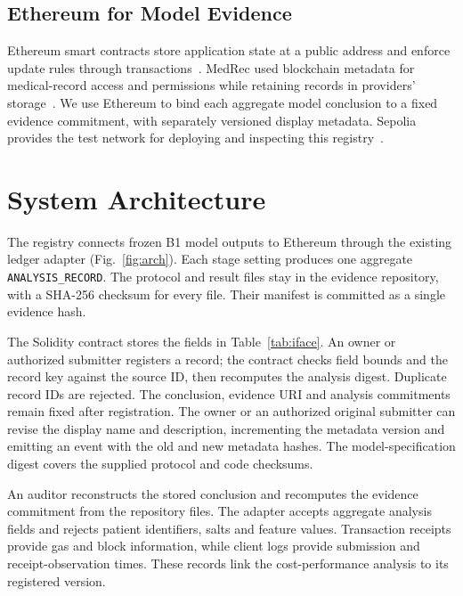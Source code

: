 \documentclass[journal,twoside]{IEEEtran}
\begin{document}
\subsection{Ethereum for Model Evidence}
Ethereum smart contracts store application state at a public address and enforce update rules through transactions~\cite{ethereumcontracts}. MedRec used blockchain metadata for medical-record access and permissions while retaining records in providers' storage~\cite{azaria2016}. We use Ethereum to bind each aggregate model conclusion to a fixed evidence commitment, with separately versioned display metadata. Sepolia provides the test network for deploying and inspecting this registry~\cite{ethereumnetworks}.

\section{System Architecture}
\label{sec:arch}
The registry connects frozen B1 model outputs to Ethereum through the existing ledger adapter (Fig.~\ref{fig:arch}). Each stage setting produces one aggregate \texttt{ANALYSIS\_RECORD}. The protocol and result files stay in the evidence repository, with a SHA-256 checksum for every file. Their manifest is committed as a single evidence hash.

The Solidity contract stores the fields in Table~\ref{tab:iface}. An owner or authorized submitter registers a record; the contract checks field bounds and the record key against the source ID, then recomputes the analysis digest. Duplicate record IDs are rejected. The conclusion, evidence URI and analysis commitments remain fixed after registration. The owner or an authorized original submitter can revise the display name and description, incrementing the metadata version and emitting an event with the old and new metadata hashes. The model-specification digest covers the supplied protocol and code checksums.

An auditor reconstructs the stored conclusion and recomputes the evidence commitment from the repository files. The adapter accepts aggregate analysis fields and rejects patient identifiers, salts and feature values. Transaction receipts provide gas and block information, while client logs provide submission and receipt-observation times. These records link the cost-performance analysis to its registered version.
\end{document}
